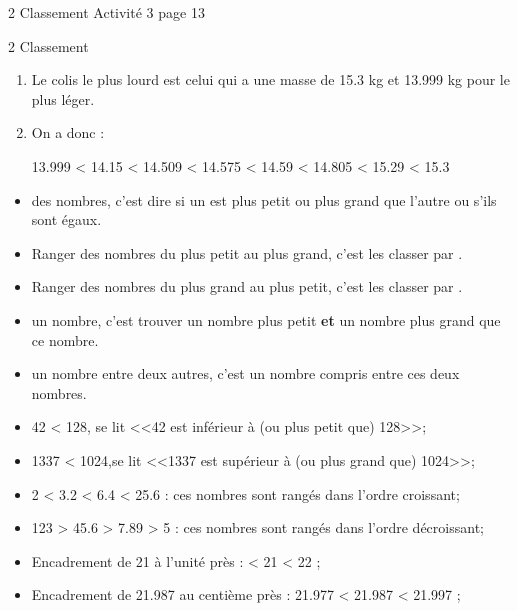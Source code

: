 \begin{myact}{2 Classement}
	Activité 3 page 13
\end{myact}

\begin{myactrep}{2 Classement}
	\begin{enumerate}
		\item Le colis le plus lourd est celui qui a une masse de \num{15.3} kg et \num{13.999} kg pour le plus léger.
		\item On a donc :
		
		\num{13.999} < \num{14.15} < \num{14.509} < \num{14.575} < \num{14.59} <  \num{14.805} < \num{15.29} < \num{15.3}
	\end{enumerate}
\end{myactrep}

\begin{mydefs}
	\begin{itemize}
		\item {} des nombres, c'est dire si un est plus petit ou plus grand que l'autre ou s'ils sont égaux.
		
		\item Ranger des nombres du plus petit au plus grand, c'est les classer par .
		
		\item Ranger des nombres du plus grand au plus petit, c'est les classer par .
		
		\item {} un nombre, c'est trouver un nombre plus petit \textbf{et} un nombre plus grand que ce nombre.
		
		\item {} un nombre entre deux autres, c'est un nombre compris entre ces deux nombres.
	\end{itemize}
\end{mydefs}

\begin{myexs}
	\begin{itemize}
		\item 42 < 128, \pause se lit <<42 est inférieur à (ou plus petit que) 128>>;\pause
		\item 1337 < 1024,\pause se lit <<\num{1337} est supérieur à (ou plus grand que) \num{1024}>>;\pause
		\item 2 < \num{3.2} < \num{6.4} < \num{25.6} : ces nombres sont rangés dans l'ordre \pause croissant;\pause
		\item 123 > \num{45.6} > \num{7.89} > \num{5} : ces nombres sont rangés dans l'ordre \pause décroissant;\pause
		\item Encadrement de 21 à l'unité près :  < 21 < 22 ;\pause
		\item Encadrement de \num{21.987} au centième près : \pause \num{21.977} < \num{21.987} < \num{21.997} ;\pause
	\end{itemize}
\end{myexs}

